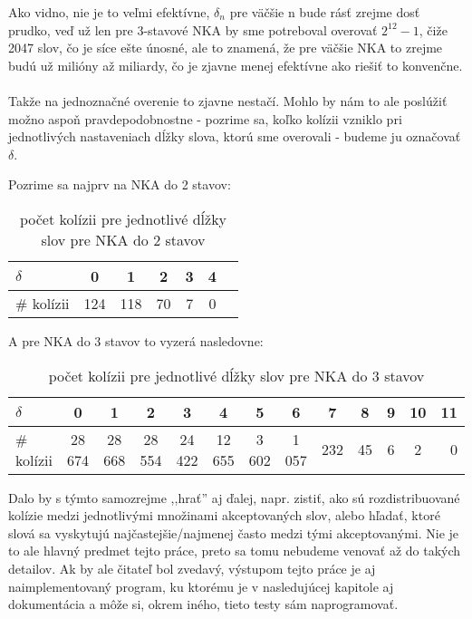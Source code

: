 Ako vidno, nie je to veľmi efektívne, $\delta_n$ pre väčšie n bude rásť zrejme dosť prudko, veď už len pre 3-stavové NKA by sme potreboval overovať $2^12 - 1$, čiže 2047 slov, čo je síce ešte únosné, ale to znamená, že pre väčšie NKA to zrejme budú už milióny až miliardy, čo je zjavne menej efektívne ako riešiť to konvenčne.
\paragraph{}
Takže na jednoznačné overenie to zjavne nestačí. Mohlo by nám to ale poslúžiť možno aspoň pravdepodobnostne - pozrime sa, koľko kolízii vzniklo pri jednotlivých nastaveniach dĺžky slova, ktorú sme overovali - budeme ju označovať $\delta$.

Pozrime sa najprv na NKA do 2 stavov:
\begin{table}[h]
  \centering
  \begin{tabular}{|l|c|c|c|c|c|r|}
    \hline
    $\delta$ & 0 & 1 & 2 & 3 & 4 \\ 
    \hline
    \# kolízii & 124 & 118 & 70 & 7 & 0 \\
    \hline
  \end{tabular}
  \caption{počet kolízii pre jednotlivé dĺžky slov pre NKA do 2 stavov}
\end{table}

A pre NKA do 3 stavov to vyzerá nasledovne:
\begin{table}[h]
  \centering
  \begin{tabular}{|l|c|c|c|c|c|c|c|c|c|c|c|r|}
    \hline
    $\delta$ & 0 & 1 & 2 & 3 & 4 & 5 & 6 & 7 & 8 & 9 & 10 & 11 \\ 
    \hline
    \# kolízii & 28 674 & 28 668 & 28 554 & 24 422 & 12 655 & 3 602 & 1 057 & 232 & 45 & 6 & 2 & 0\\ 
    \hline
  \end{tabular}
  \caption{počet kolízii pre jednotlivé dĺžky slov pre NKA do 3 stavov}
\end{table}

Dalo by s týmto samozrejme ,,hrať'' aj ďalej, napr. zistiť, ako sú rozdistribuované kolízie medzi jednotlivými množinami akceptovaných slov, alebo hľadať, ktoré slová sa vyskytujú najčastejšie/najmenej často medzi tými akceptovanými. Nie je to ale hlavný predmet tejto práce, preto sa tomu nebudeme venovať až do takých detailov. Ak by ale čitateľ bol zvedavý, výstupom tejto práce je aj naimplementovaný program, ku ktorému je v nasledujúcej kapitole aj dokumentácia a môže si, okrem iného, tieto testy sám naprogramovať.


